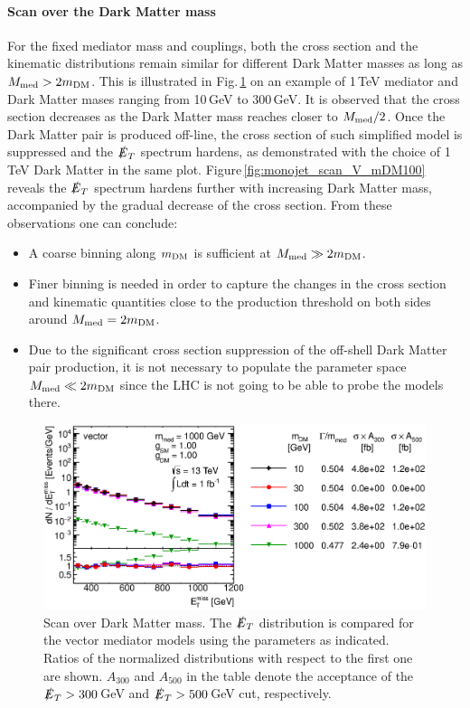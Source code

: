 \paragraph{Scan over the Dark Matter mass}

For the fixed mediator mass and couplings, both the cross section and the kinematic distributions remain similar for different Dark Matter masses as long as $M_{\rm{med}}>2m_{\rm{DM}}$. This is illustrated in Fig.\,\ref{fig:monojet_scan_V_mDM1000} on an example of 1\,TeV mediator and Dark Matter mases ranging from 10\,GeV to 300\,GeV. It is observed that the cross section decreases as the Dark Matter mass reaches closer to $M_{\rm{med}}/2$. Once the Dark Matter pair is produced off-line, the cross section of such simplified model is suppressed and the $\slashed{E}_T$ spectrum hardens, as demonstrated with the choice of 1\,TeV Dark Matter in the same plot. Figure\,\ref{fig:monojet_scan_V_mDM100} reveals the $\slashed{E}_T$ spectrum hardens further with increasing Dark Matter mass, accompanied by the gradual decrease of the cross section. From these observations one can conclude:
\begin{itemize}
\item A coarse binning along $m_{\rm{DM}}$ is sufficient at $M_{\rm{med}} \gg 2m_{\rm{DM}}$.
\item Finer binning is needed in order to capture the changes in the cross section and kinematic quantities close to the production threshold on both sides around $M_{\rm{med}}=2m_{\rm{DM}}$.
\item Due to the significant cross section suppression of the off-shell Dark Matter pair production, it is not necessary to populate the parameter space $M_{\rm{med}} \ll 2m_{\rm{DM}}$ since the LHC is not going to be able to probe the models there.
\end{itemize}

\begin{figure}
\centering
\includegraphics[width=0.9\linewidth]{figures/monojet/scan_mDM_V_1000.eps}
\caption{Scan over Dark Matter mass. The $\slashed{E}_T$ distribution is compared for the vector mediator models using the parameters as indicated. Ratios of the normalized distributions with respect to the first one are shown. $A_{300}$ and $A_{500}$ in the table denote the acceptance of the $\slashed{E}_T>300$\,GeV and $\slashed{E}_T>500$\,GeV cut, respectively.}
\label{fig:monojet_scan_V_mDM1000}
\end{figure}

